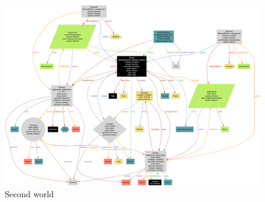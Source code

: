 \begin{figure}[h]
    \centering
    \includegraphics[width=16cm]{images/worlds/second.png}
    \caption{Second world}
\end{figure}
